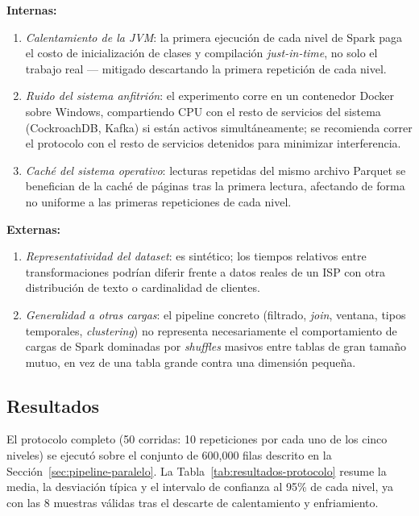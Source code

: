 \textbf{Internas:}
\begin{enumerate}[leftmargin=1.5em]
    \item \emph{Calentamiento de la JVM}: la primera ejecución de cada nivel de Spark paga el
        costo de inicialización de clases y compilación \emph{just-in-time}, no solo el trabajo
        real — mitigado descartando la primera repetición de cada nivel.
    \item \emph{Ruido del sistema anfitrión}: el experimento corre en un contenedor Docker sobre
        Windows, compartiendo CPU con el resto de servicios del sistema (CockroachDB, Kafka) si
        están activos simultáneamente; se recomienda correr el protocolo con el resto de servicios
        detenidos para minimizar interferencia.
    \item \emph{Caché del sistema operativo}: lecturas repetidas del mismo archivo Parquet se
        benefician de la caché de páginas tras la primera lectura, afectando de forma no uniforme
        a las primeras repeticiones de cada nivel.
\end{enumerate}

\textbf{Externas:}
\begin{enumerate}[leftmargin=1.5em]
    \item \emph{Representatividad del dataset}: es sintético; los tiempos relativos entre
        transformaciones podrían diferir frente a datos reales de un ISP con otra distribución de
        texto o cardinalidad de clientes.
    \item \emph{Generalidad a otras cargas}: el pipeline concreto (filtrado, \emph{join}, ventana,
        tipos temporales, \emph{clustering}) no representa necesariamente el comportamiento de
        cargas de Spark dominadas por \emph{shuffles} masivos entre tablas de gran tamaño mutuo,
        en vez de una tabla grande contra una dimensión pequeña.
\end{enumerate}

\subsection{Resultados}

El protocolo completo (50 corridas: 10 repeticiones por cada uno de los cinco niveles) se ejecutó
sobre el conjunto de 600{,}000 filas descrito en la Sección~\ref{sec:pipeline-paralelo}. La
Tabla~\ref{tab:resultados-protocolo} resume la media, la desviación típica y el intervalo de
confianza al 95\% de cada nivel, ya con las 8 muestras válidas tras el descarte de calentamiento y
enfriamiento.

